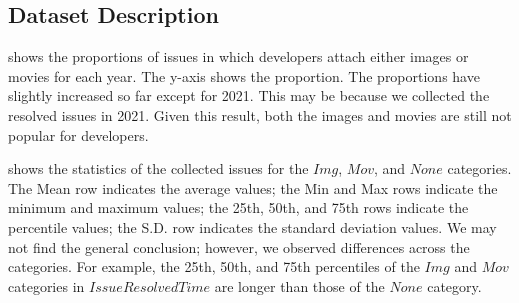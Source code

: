 \subsection{Dataset Description}



 shows the proportions of 
issues in which developers attach either 
images or movies for each year. 
The y-axis shows the proportion. 
The proportions have slightly increased so far 
except for 2021. 
This may be because we collected the resolved issues 
in 2021. 
Given this result, both the images and movies are still 
not popular for developers. 




 shows the statistics
of the collected issues for the $Img$, $Mov$,
and $None$ categories.
The Mean row indicates the average values; 
the Min and Max rows indicate the minimum and maximum values; 
the 25th, 50th, and 75th rows indicate the percentile values; 
the S.D. row indicates the standard deviation values. 
We may not find the general conclusion; 
however, we observed differences across the categories. 
For example, the 25th, 50th, and 75th percentiles of 
the $Img$ and $Mov$ categories in $IssueResolvedTime$ are 
longer than those of the $None$ category. 
